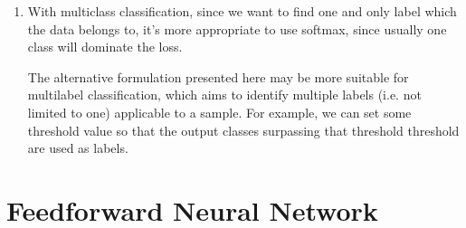\begin{enumerate}[label=(\alph*)]
	\item With multiclass classification, since we want to find one and only label which
	      the data belongs to, it's more appropriate to use softmax, since usually one class will dominate the loss.

	      The alternative formulation presented here may be more suitable for multilabel classification,
	      which aims to identify multiple labels (i.e. not limited to one) applicable to a sample.
		  For example, we can set some threshold value so that the output classes surpassing that threshold
		  threshold are used as labels.
\end{enumerate}


\newpage
\section{Feedforward Neural Network}

